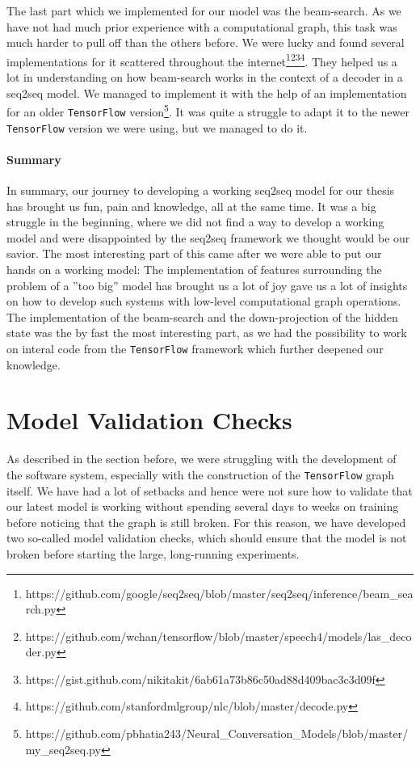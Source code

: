 The last part which we implemented for our model was the beam-search. As we have not had much prior experience with a computational graph, this task was much harder to pull off than the others before. We were lucky and found several implementations for it scattered throughout the internet\footnote{https://github.com/google/seq2seq/blob/master/seq2seq/inference/beam\_search.py}\footnote{https://github.com/wchan/tensorflow/blob/master/speech4/models/las\_decoder.py}\footnote{https://gist.github.com/nikitakit/6ab61a73b86c50ad88d409bac3c3d09f}\footnote{https://github.com/stanfordmlgroup/nlc/blob/master/decode.py}. They helped us a lot in understanding on how beam-search works in the context of a decoder in a seq2seq model. We managed to implement it with the help of an implementation for an older \texttt{TensorFlow} version\footnote{https://github.com/pbhatia243/Neural\_Conversation\_Models/blob/master/my\_seq2seq.py}. It was quite a struggle to adapt it to the newer \texttt{TensorFlow} version we were using, but we managed to do it.

\paragraph{Summary} In summary, our journey to developing a working seq2seq model for our thesis has brought us fun, pain and knowledge, all at the same time. It was a big struggle in the beginning, where we did not find a way to develop a working model and were disappointed by the seq2seq framework we thought would be our savior. The most interesting part of this came after we were able to put our hands on a working model: The implementation of features surrounding the problem of a ''too big'' model has brought us a lot of joy gave us a lot of insights on how to develop such systems with low-level computational graph operations. The implementation of the beam-search and the down-projection of the hidden state was the by fast the most interesting part, as we had the possibility to work on interal code from the \texttt{TensorFlow} framework which further deepened our knowledge.

\section{Model Validation Checks}
\label{software_sytem:model_validation_checks}
As described in the section before, we were struggling with the development of the software system, especially with the construction of the \texttt{TensorFlow} graph itself. We have had a lot of setbacks and hence were not sure how to validate that our latest model is working without spending several days to weeks on training before noticing that the graph is still broken. For this reason, we have developed two so-called model validation checks, which should ensure that the model is not broken before starting the large, long-running experiments.

